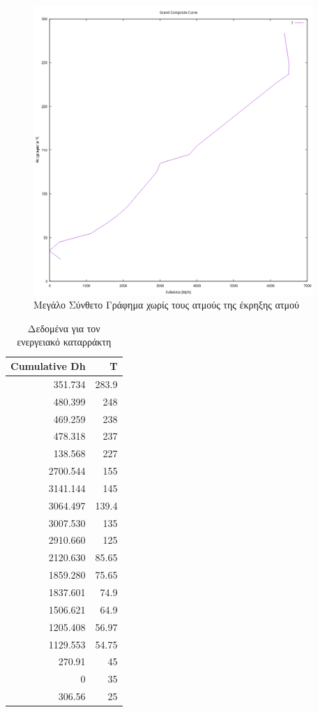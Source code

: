 \documentclass[11pt]{article}
\begin{document}
\begin{figure}[htbp]
\centering
\includegraphics[width=400px]{Diagrams/grand_composite_curve_2.png}
\caption{Μεγάλο Σύνθετο Γράφημα χωρίς τους ατμούς της έκρηξης ατμού}
\end{figure}

\begin{table}[htbp]
\caption{Δεδομένα για τον ενεργειακό καταρράκτη}
\centering
\begin{tabular}{rr}
Cumulative  Dh & T\\
\hline
351.734 & 283.9\\
480.399 & 248\\
469.259 & 238\\
478.318 & 237\\
138.568 & 227\\
2700.544 & 155\\
3141.144 & 145\\
3064.497 & 139.4\\
3007.530 & 135\\
2910.660 & 125\\
2120.630 & 85.65\\
1859.280 & 75.65\\
1837.601 & 74.9\\
1506.621 & 64.9\\
1205.408 & 56.97\\
1129.553 & 54.75\\
270.91 & 45\\
0 & 35\\
306.56 & 25\\
\end{tabular}
\end{table}
\end{document}
